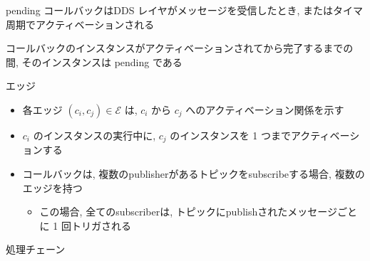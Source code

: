 \begin{frame}{pending}
    コールバックはDDS レイヤがメッセージを受信したとき, またはタイマ周期でアクティベーションされる
    \begin{definition}[pending]
        コールバックのインスタンスがアクティベーションされてから完了するまでの間, そのインスタンスは pending である
    \end{definition}
\end{frame}

\begin{frame}{エッジ}
    \begin{itemize}
        \item 各エッジ $\left(c_{i}, c_{j}\right) \in \mathcal{E}$ は, $c_{i}$ から $c_{j}$ へのアクティベーション関係を示す
        \item $c_{i}$ のインスタンスの実行中に, $c_{j}$ のインスタンスを 1 つまでアクティベーションする
        \item コールバックは, 複数のpublisherがあるトピックをsubscribeする場合, 複数のエッジを持つ
              \begin{itemize}
                  \item この場合, 全てのsubscriberは, トピックにpublishされたメッセージごとに 1 回トリガされる
              \end{itemize}
    \end{itemize}
\end{frame}

\begin{frame}{処理チェーン}
\end{frame}

